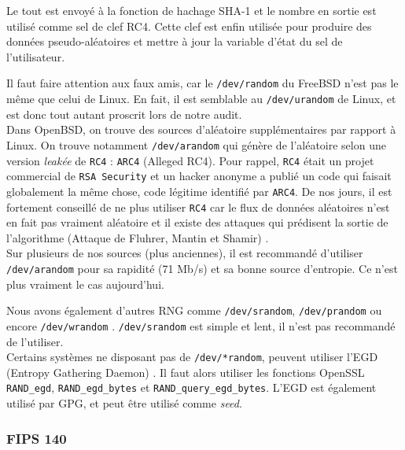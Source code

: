 			Le tout est envoyé à la fonction de hachage SHA-1 et le nombre en sortie est utilisé comme sel de clef RC4. Cette clef est enfin utilisée pour produire des données pseudo-aléatoires et mettre à jour la variable d'état du sel de l'utilisateur. 
			
			
			Il faut faire attention aux faux amis, car le \texttt{/dev/random} du FreeBSD n'est pas le même que celui de Linux. En fait, il est semblable au \texttt{/dev/urandom} de Linux, et est donc tout autant proscrit lors de notre audit.\\ 

			Dans OpenBSD, on trouve des sources d'aléatoire supplémentaires par rapport à Linux. On trouve notamment \texttt{/dev/arandom} qui génère de l'aléatoire selon une version \textit{leakée} de \texttt{RC4} : \texttt{ARC4} (Alleged RC4). Pour rappel, \texttt{RC4} était un projet commercial de \texttt{RSA Security} et un hacker anonyme a publié un code qui faisait globalement la même chose, code légitime identifié par \texttt{ARC4}. De nos jours, il est fortement conseillé de ne plus utiliser \texttt{RC4} car le flux de données aléatoires n'est en fait pas vraiment aléatoire et il existe des attaques qui prédisent la sortie de l'algorithme (Attaque de Fluhrer, Mantin et Shamir) \nocite{Fluhrer01weaknessesin}.\\
			
			
			Sur plusieurs de nos sources (plus anciennes), il est recommandé d'utiliser \texttt{/dev/arandom} pour sa rapidité (71 Mb/s) et sa bonne source d'entropie. Ce n'est plus vraiment le cas aujourd'hui.\\

	
		
			Nous avons également d'autres RNG comme \texttt{/dev/srandom}, \texttt{/dev/prandom} ou encore \texttt{/dev/wrandom} \cite{miros2013}. \texttt{/dev/srandom} est simple et lent, il n'est pas recommandé de l'utiliser.\\

			Certains systèmes ne disposant pas de \texttt{/dev/*random}, peuvent utiliser l'EGD (Entropy Gathering Daemon) \cite{egdsf.net}. Il faut alors utiliser les fonctions OpenSSL \texttt{RAND\_egd}, \texttt{RAND\_egd\_bytes} et \texttt{RAND\_query\_egd\_bytes}. L'EGD est également utilisé par GPG, et peut être utilisé comme \textit{seed}.
			
	\subsubsection{FIPS 140}
	
